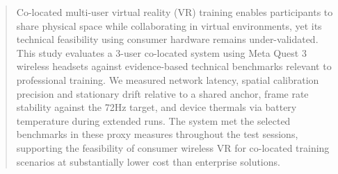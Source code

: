 \begin{abstract}
Co-located multi-user virtual reality (VR) training enables participants to share physical space while collaborating in virtual environments, yet its technical feasibility using consumer hardware remains under-validated. This study evaluates a 3-user co-located system using Meta Quest 3 wireless headsets against evidence-based technical benchmarks relevant to professional training. We measured network latency, spatial calibration precision and stationary drift relative to a shared anchor, frame rate stability against the 72Hz target, and device thermals via battery temperature during extended runs. The system met the selected benchmarks in these proxy measures throughout the test sessions, supporting the feasibility of consumer wireless VR for co-located training scenarios at substantially lower cost than enterprise solutions.
\end{abstract}